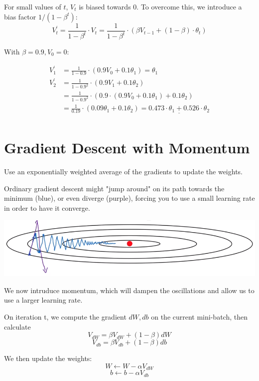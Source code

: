 For small values of $t$, $V_t$ is biased towards $0$. To overcome this, we introduce a bias factor $1 / (1 - \beta^t )$:
\[
    V_t^{'} = \frac{1}{1 - \beta^t} \cdot V_t = \frac{1}{1 - \beta^t} \cdot (\beta V_{t - 1} + (1 - \beta) \cdot \theta_t)
\]

With $\beta = 0.9, V_0 = 0$:

\begin{align*}
    V_1^{'} &= \frac{1}{1 - 0.9}  \cdot (0.9V_0 + 0.1 \theta_1 ) = \theta_1 \\
    V_2^{'} &= \frac{1}{1 - 0.9^2} \cdot (0.9V_1 + 0.1 \theta_2 )  \\
            &= \frac{1}{1 - 0.9^2} \cdot (0.9 \cdot (0.9V_0 + 0.1 \theta_1 ) + 0.1 \theta_2 )  \\
            &= \frac{1}{0.19} \cdot (0.09 \theta_1 + 0.1 \theta_2 ) = \underline{0.473 \cdot \theta_1 + 0.526 \cdot \theta_2} \\
\end{align*}






\section{Gradient Descent with Momentum}

Use an exponentially weighted average of the gradients to update the weights.

Ordinary gradient descent might "jump around" on its path towards the minimum (blue), 
or even diverge (purple), forcing you to use a small learning rate in order to have it converge.

\includegraphics*[width=0.7\linewidth]{images/gd_without_momentum.png}

We now intruduce momentum, which will dampen the oscillations and allow us to use a larger learning rate.

On iteration t, we compute the gradient $dW, db$ on the current mini-batch, then calculate
\[ V_{dW} =\beta V_{dW} + (1 - \beta) dW \]
\[ V_{db} =\beta V_{db} + (1 - \beta) db \]

We then update the weights:
\[ W \gets W - \alpha V_{dW} \]
\[ b \gets b - \alpha V_{db} \]

